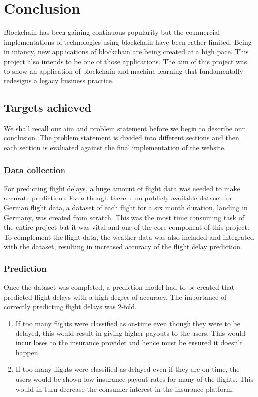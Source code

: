 \chapter{Conclusion}
Blockchain has been gaining continuous popularity but the commercial implementations of technologies using blockchain have been rather limited. Being in infancy, new applications of blockchain are being created at a high pace. This project also intends to be one of those applications. The aim of this project was to show an application of blockchain and machine learning that fundamentally redesigns a legacy business practice.

\section{Targets achieved}
We shall recall our aim and problem statement before we begin to describe our conclusion. The problem statement is divided into different sections and then each section is evaluated against the final implementation of the website. 

\subsection{Data collection}
For predicting flight delays, a huge amount of flight data was needed to make accurate predictions. Even though there is no publicly available dataset for German flight data, a dataset of each flight for a six month duration, landing in Germany, was created from scratch. This was the most time consuming task of the entire project but it was vital and one of the core component of this project.
\\ To complement the flight data, the weather data was also included and integrated with the dataset, resulting in increased accuracy of the flight delay prediction.

\subsection{Prediction}
Once the dataset was completed, a prediction model had to be created that predicted flight delays with a high degree of accuracy. The importance of correctly predicting flight delays was 2-fold.
\begin{enumerate}
    \item If too many flights were classified as on-time even though they were to be delayed, this would result in giving higher payouts to the users. This would incur loses to the insurance provider and hence must be ensured it doesn't happen.
    \item If too many flights were classified as delayed even if they are on-time, the users would be shown low insurance payout rates for many of the flights. This would in turn decrease the consumer interest in the insurance platform.
\end{enumerate}

